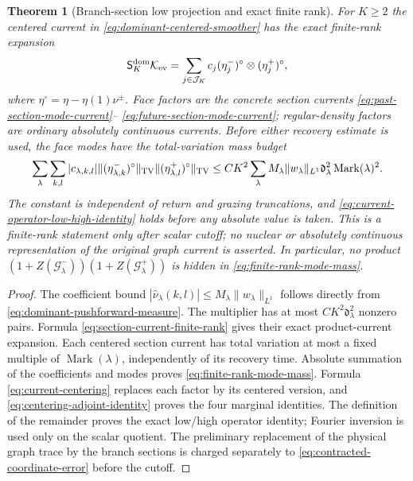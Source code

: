 \documentclass[11pt]{article}
\newtheorem{theorem}{Theorem}[section]
\begin{document}
\begin{theorem}[Branch-section low projection and exact finite rank]
\label{thm:canonical-dominant-smoothing}
For $K\ge2$ the centered current in
\eqref{eq:dominant-centered-smoother} has the exact finite-rank expansion
\begin{equation}
\label{eq:finite-rank-low-kernel}
 \mathsf S_K^{\rm dom}\mathcal K_{\rm ev}
 =\sum_{j\in\mathcal J_K}c_j
       (\eta_j^-)^\circ\otimes(\eta_j^+)^\circ,
\end{equation}
where $\eta^\circ=\eta-\eta(1)\nu^\pm$.  Face factors are the concrete
section currents \eqref{eq:past-section-mode-current}--
\eqref{eq:future-section-mode-current}; regular-density factors are ordinary
absolutely continuous currents.  Before either recovery estimate is used,
the face modes have the total-variation mass budget
\begin{equation}
\label{eq:finite-rank-mode-mass}
 \sum_{\lambda}\sum_{k,l}|c_{\lambda,k,l}|
 \|(\eta^-_{\lambda,k})^\circ\|_{\rm TV}
 \|(\eta^+_{\lambda,l})^\circ\|_{\rm TV}
 \le CK^2\sum_\lambda M_\lambda\|w_\lambda\|_{L^1}
 \mathfrak d_\lambda^2\operatorname{Mark}(\lambda)^2.
\end{equation}
The constant is independent of return and grazing truncations, and
\eqref{eq:current-operator-low-high-identity} holds before any absolute value
is taken.  This is a finite-rank statement only after scalar cutoff; no
nuclear or absolutely continuous representation of the original graph current
is asserted.  In particular, no product
$(1+Z(\mathcal G^-_\lambda))(1+Z(\mathcal G^+_\lambda))$ is hidden in
\eqref{eq:finite-rank-mode-mass}.
\end{theorem}

\begin{proof}
The coefficient bound
$|\widehat\nu_\lambda(k,l)|\le
M_\lambda\|w_\lambda\|_{L^1}$ follows directly from
\eqref{eq:dominant-pushforward-measure}.  The multiplier has at most
$CK^2\mathfrak d_\lambda^2$ nonzero pairs.  Formula
\eqref{eq:section-current-finite-rank} gives their exact product-current
expansion.  Each centered section current has total variation at most a fixed
multiple of $\operatorname{Mark}(\lambda)$, independently of its recovery
time.  Absolute summation of the coefficients and modes proves
\eqref{eq:finite-rank-mode-mass}.  Formula
\eqref{eq:current-centering} replaces each factor by its centered version,
and \eqref{eq:centering-adjoint-identity} proves the four marginal identities.
The definition of the remainder proves the exact low/high operator identity;
Fourier inversion is used only on the scalar quotient.  The preliminary
replacement of the physical graph trace by the branch sections is charged
separately to \eqref{eq:contracted-coordinate-error} before the cutoff.
\end{proof}
\end{document}
